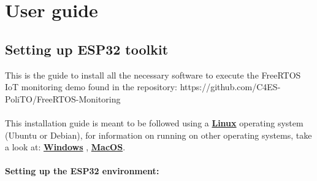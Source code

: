 \chapter{User guide}

\section{Setting up ESP32 toolkit}

This is the guide to install all the necessary software to execute the FreeRTOS IoT monitoring demo found in the repository: https://github.com/C4ES-PoliTO/FreeRTOS-Monitoring
\\~\\
This installation guide is meant to be followed using a \href{https://docs.espressif.com/projects/esp-idf/en/latest/esp32/get-started/linux-macos-setup.html}{\textbf{Linux}} operating system (Ubuntu or Debian), for information on running on other operating systems, take a look at: \href{https://docs.espressif.com/projects/esp-idf/en/latest/esp32/get-started/windows-setup.html}{\textbf{Windows}} , \href{https://docs.espressif.com/projects/esp-idf/en/latest/esp32/get-started/linux-macos-setup.html}{\textbf{MacOS}}.
\\~\\
\textbf{Setting up the ESP32 environment:}
\\
